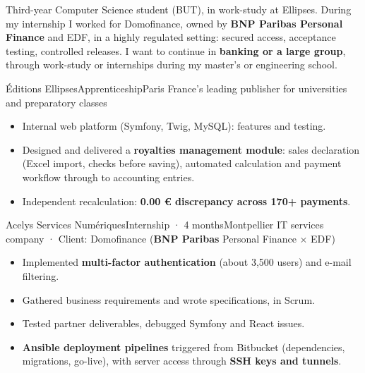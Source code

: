 \def\cvenglish{}

\renewcommand{\cvheadline}{Computer Science student, work-study \,·\, Banking environment experience}
\renewcommand{\cvheaddomains}{Security \,·\, Databases \& SQL \,·\, DevOps \,·\, Mathematics}


\makeheader

\begin{minipage}[t]{\mainwidth}
\raggedright

Third-year Computer Science student (BUT), in work-study at Ellipses. During my internship
I worked for Domofinance, owned by \textbf{BNP Paribas Personal Finance} and EDF, in a highly regulated setting: secured access,
acceptance testing, controlled releases. I want to continue in \textbf{banking or a large group},
through work-study or internships during my master's or engineering school.
\keyfigures


  {Éditions Ellipses}{Apprenticeship}{Paris}
  {France's leading publisher for universities and preparatory classes}
\begin{itemize}
  \item Internal web platform (Symfony, Twig, MySQL): features and testing.
  \item Designed and delivered a \textbf{royalties management module}: sales declaration (Excel import, checks before saving), automated calculation and payment workflow through to accounting entries.
  \item Independent recalculation: \textbf{0.00 € discrepancy across 170+ payments}.
\end{itemize}

  {Acelys Services Numériques}{Internship · 4 months}{Montpellier}
  {IT services company · Client: Domofinance (\textbf{\color{ink}BNP Paribas} Personal Finance × EDF)}
\begin{itemize}
  \item Implemented \textbf{multi-factor authentication} (about 3,500 users) and e-mail filtering.
  \item Gathered business requirements and wrote specifications, in Scrum.
  \item Tested partner deliverables, debugged Symfony and React issues.
  \item \textbf{Ansible deployment pipelines} triggered from Bitbucket (dependencies, migrations, go-live), with server access through \textbf{SSH keys and tunnels}.
\end{itemize}


\end{minipage}
